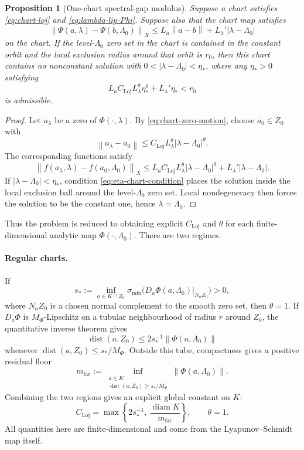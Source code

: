 \documentclass[12pt]{article}
\newtheorem{proposition}[theorem]{Proposition}
\theoremstyle{definition}
\theoremstyle{remark}
\newcommand{\norm}[1]{\left\|#1\right\|}
\begin{document}
\begin{proposition}[One-chart spectral-gap modulus]
  \label{prop:one-chart-gap-modulus}
  Suppose a chart satisfies \eqref{eq:chart-loj} and
  \eqref{eq:lambda-lip-Phi}.  Suppose also that the chart map satisfies
  \[
    \norm{\Psi(a,\lambda)-\Psi(b,\Lambda_0)}_X
    \leq L_a\norm{a-b}+L_\lambda'|\lambda-\Lambda_0|
  \]
  on the chart.  If the level-$\Lambda_0$ zero set in the chart is
  contained in the constant orbit and the local exclusion radius around
  that orbit is \(r_0\), then this chart contains no nonconstant solution
  with \(0<|\lambda-\Lambda_0|<\eta_*\), where any \(\eta_*>0\)
  satisfying
  \begin{equation}\label{eq:eta-chart-condition}
    L_a C_{\mathrm{Loj}}L_\lambda^\theta\eta_*^\theta
    +L_\lambda'\eta_*<r_0
  \end{equation}
  is admissible.
\end{proposition}

\begin{proof}
  Let \(a_\lambda\) be a zero of \(\Phi(\cdot,\lambda)\).  By
  \eqref{eq:chart-zero-motion}, choose \(a_0\in Z_0\) with
  \[
    \norm{a_\lambda-a_0}
    \leq C_{\mathrm{Loj}}L_\lambda^\theta
    |\lambda-\Lambda_0|^\theta .
  \]
  The corresponding functions satisfy
  \[
    \norm{f(a_\lambda,\lambda)-f(a_0,\Lambda_0)}_X
    \leq
    L_a C_{\mathrm{Loj}}L_\lambda^\theta
    |\lambda-\Lambda_0|^\theta
    +L_\lambda'|\lambda-\Lambda_0|.
  \]
  If \(|\lambda-\Lambda_0|<\eta_*\), condition
  \eqref{eq:eta-chart-condition} places the solution inside the local
  exclusion ball around the level-\(\Lambda_0\) zero set.  Local
  nondegeneracy then forces the solution to be the constant one, hence
  \(\lambda=\Lambda_0\).
\end{proof}

Thus the problem is reduced to obtaining explicit
\(C_{\mathrm{Loj}}\) and \(\theta\) for each finite-dimensional
analytic map \(\Phi(\cdot,\Lambda_0)\).  There are two regimes.

\paragraph{Regular charts.}
If
\[
  s_*:=
  \inf_{a\in K\cap Z_0}
  \sigma_{\min}\bigl(D_a\Phi(a,\Lambda_0)|_{N_aZ_0}\bigr)>0,
\]
where \(N_aZ_0\) is a chosen normal complement to the smooth zero set,
then \(\theta=1\).  If \(D_a\Phi\) is \(M_\Phi\)-Lipschitz on a tubular
neighbourhood of radius \(r\) around \(Z_0\), the quantitative inverse
theorem gives
\[
  \operatorname{dist}(a,Z_0)
  \leq 2s_*^{-1}\norm{\Phi(a,\Lambda_0)}
\]
whenever \(\operatorname{dist}(a,Z_0)\leq s_*/M_\Phi\).  Outside this
tube, compactness gives a positive residual floor
\[
  m_{\mathrm{far}}:=
  \inf_{\substack{a\in K\\
  \operatorname{dist}(a,Z_0)\geq s_*/M_\Phi}}
  \norm{\Phi(a,\Lambda_0)}.
\]
Combining the two regions gives an explicit global constant on \(K\):
\[
  C_{\mathrm{Loj}}
  =
  \max\left\{
    2s_*^{-1},\
    \frac{\operatorname{diam}K}{m_{\mathrm{far}}}
  \right\},
  \qquad \theta=1.
\]
All quantities here are finite-dimensional and come from the
Lyapunov--Schmidt map itself.
\end{document}
